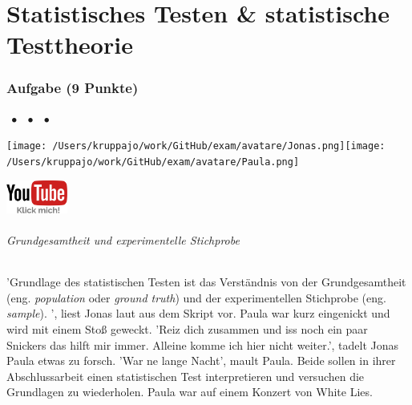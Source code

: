 \documentclass[a4paper, 9pt]{scrartcl}\usepackage[]{graphicx}\usepackage[]{xcolor}
\begin{document}
\part{Statistisches Testen \& statistische Testtheorie}

\section{Aufgabe \hfill (9 Punkte)}


 
\ifcollection
\begin{flushright}
\tiny
\textbf{\examinhaltstart}
\exammodulestat $\;\bullet$
\exammodulestatbbv $\;\bullet$
\exammodulestatversuch $\;\bullet$
\exammodulebiostat
\vspace{-4Ex}
\end{flushright}
\begin{minipage}[t]{0.5\textwidth}
\texttt{[image: /Users/kruppajo/work/GitHub/exam/avatare/Jonas.png]}\hspace{-4mm}\texttt{[image: /Users/kruppajo/work/GitHub/exam/avatare/Paula.png]}
\end{minipage}
\begin{minipage}[t]{0.5\textwidth}
\hfill
\href{https://youtu.be/aHVYuFKTqZs}{\includegraphics[width = 2cm]{img/youtube}}
\end{minipage}
\fi



\ifcollection
\paragraph{Grundgesamtheit und experimentelle Stichprobe}
\fi

'Grundlage des statistischen Testen ist das Verständnis von der Grundgesamtheit (eng. \textit{population} oder \textit{ground truth}) und der experimentellen Stichprobe (eng. \textit{sample}). ', liest Jonas laut aus dem Skript vor. Paula war kurz eingenickt und wird mit einem Stoß geweckt. 'Reiz dich zusammen und iss noch ein paar Snickers das hilft mir immer. Alleine komme ich hier nicht weiter.', tadelt Jonas Paula etwas zu forsch. 'War ne lange Nacht', mault Paula. Beide sollen in ihrer Abschlussarbeit einen statistischen Test interpretieren und versuchen die Grundlagen zu wiederholen. Paula war auf einem Konzert von White Lies.
\end{document}
